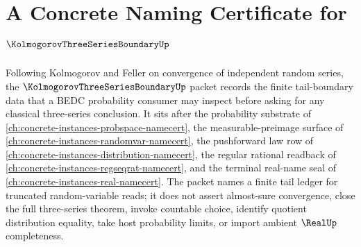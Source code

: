 \chapter{A Concrete Naming Certificate for $\KolmogorovThreeSeriesBoundaryUp$}
\label{ch:concrete-instances-kolmogorov-three-series-boundary-namecert}

Following Kolmogorov and Feller on convergence of independent random series, the $\KolmogorovThreeSeriesBoundaryUp$ packet records the finite tail-boundary data that a BEDC probability consumer may inspect before asking for any classical three-series conclusion. It sits after the probability substrate of \autoref{ch:concrete-instances-probspace-namecert}, the measurable-preimage surface of \autoref{ch:concrete-instances-randomvar-namecert}, the pushforward law row of \autoref{ch:concrete-instances-distribution-namecert}, the regular rational readback of \autoref{ch:concrete-instances-regseqrat-namecert}, and the terminal real-name seal of \autoref{ch:concrete-instances-real-namecert}. The packet names a finite tail ledger for truncated random-variable reads; it does not assert almost-sure convergence, close the full three-series theorem, invoke countable choice, identify quotient distribution equality, take host probability limits, or import ambient $\RealUp$ completeness.

